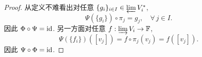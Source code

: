 \begin{proof}
    从定义不难看出对任意 $\{g_i\}_{i\in I}\in\varprojlim V^*_i$,
    \begin{equation*}
        \Psi(\{g_i\})\circ\pi_j=g_j,\quad\forall\,j\in I.
    \end{equation*}
    因此 $\Phi\circ\Psi={\rm id}$. 另一方面对任意 
    $f:\varinjlim V_i\rightarrow\mathbb{F}$, 
    \begin{equation*}
        \Psi(\{f_i\})([v_j])=f\circ\pi_j(v_j)=f([v_j]).
    \end{equation*}
    因此 $\Psi\circ\Phi={\rm id}$.
\end{proof}
